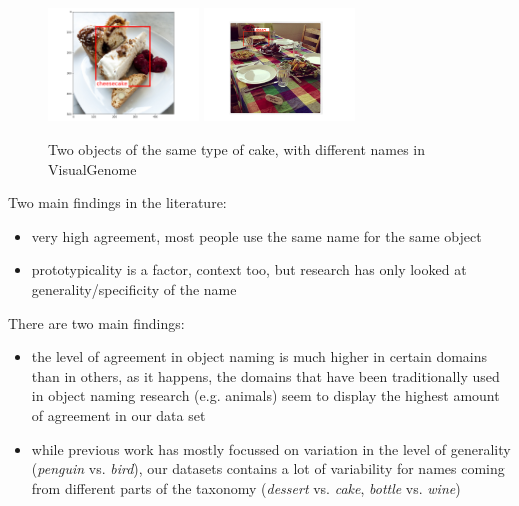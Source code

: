 \documentclass[11pt,a4paper]{article}
\begin{document}
\begin{figure}[htbp]
\begin{center}
\includegraphics[height=3cm]{Figures/cheescake.png}
\includegraphics[height=3cm]{Figures/cheesecak2.pdf}
\caption{Two objects of the same type of cake, with different names in VisualGenome}
\label{fig:cake}
\end{center}
\end{figure}

Two main findings in the literature:

\begin{itemize}
\item very high agreement, most people use the same name for the same object
\item prototypicality is a factor, context too, but research has only looked at generality/specificity of the name
\end{itemize}



There are two main findings:

\begin{itemize}
\item the level of agreement in object naming is much higher in certain domains than in others, as it happens, the domains that have been traditionally used in object naming research (e.g. animals) seem to display the highest amount of agreement in our data set 
\item while previous work has mostly focussed on variation in the level of generality (\emph{penguin} vs. \emph{bird}), our datasets contains a lot of variability for names coming from different parts of the taxonomy (\emph{dessert} vs. \emph{cake}, \emph{bottle} vs. \emph{wine})
\end{itemize}
\end{document}
